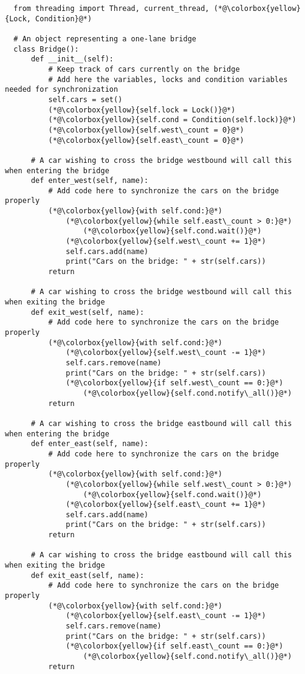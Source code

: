 \documentclass{article}
\begin{document}
\begin{lstlisting}
  from threading import Thread, current_thread, (*@\colorbox{yellow}{Lock, Condition}@*)
  
  # An object representing a one-lane bridge
  class Bridge():    
      def __init__(self):
          # Keep track of cars currently on the bridge
          # Add here the variables, locks and condition variables needed for synchronization
          self.cars = set()
          (*@\colorbox{yellow}{self.lock = Lock()}@*)
          (*@\colorbox{yellow}{self.cond = Condition(self.lock)}@*)
          (*@\colorbox{yellow}{self.west\_count = 0}@*)
          (*@\colorbox{yellow}{self.east\_count = 0}@*)
  
      # A car wishing to cross the bridge westbound will call this when entering the bridge
      def enter_west(self, name):
          # Add code here to synchronize the cars on the bridge properly
          (*@\colorbox{yellow}{with self.cond:}@*)
              (*@\colorbox{yellow}{while self.east\_count > 0:}@*)
                  (*@\colorbox{yellow}{self.cond.wait()}@*)
              (*@\colorbox{yellow}{self.west\_count += 1}@*)
              self.cars.add(name)
              print("Cars on the bridge: " + str(self.cars))
          return
          
      # A car wishing to cross the bridge westbound will call this when exiting the bridge
      def exit_west(self, name):
          # Add code here to synchronize the cars on the bridge properly
          (*@\colorbox{yellow}{with self.cond:}@*)
              (*@\colorbox{yellow}{self.west\_count -= 1}@*)
              self.cars.remove(name)
              print("Cars on the bridge: " + str(self.cars))
              (*@\colorbox{yellow}{if self.west\_count == 0:}@*)
                  (*@\colorbox{yellow}{self.cond.notify\_all()}@*)
          return
  
      # A car wishing to cross the bridge eastbound will call this when entering the bridge
      def enter_east(self, name):
          # Add code here to synchronize the cars on the bridge properly
          (*@\colorbox{yellow}{with self.cond:}@*)
              (*@\colorbox{yellow}{while self.west\_count > 0:}@*)
                  (*@\colorbox{yellow}{self.cond.wait()}@*)
              (*@\colorbox{yellow}{self.east\_count += 1}@*)
              self.cars.add(name)
              print("Cars on the bridge: " + str(self.cars))
          return
  
      # A car wishing to cross the bridge eastbound will call this when exiting the bridge
      def exit_east(self, name):
          # Add code here to synchronize the cars on the bridge properly
          (*@\colorbox{yellow}{with self.cond:}@*)
              (*@\colorbox{yellow}{self.east\_count -= 1}@*)
              self.cars.remove(name)
              print("Cars on the bridge: " + str(self.cars))
              (*@\colorbox{yellow}{if self.east\_count == 0:}@*)
                  (*@\colorbox{yellow}{self.cond.notify\_all()}@*)
          return
  

\end{lstlisting}
\end{document}
